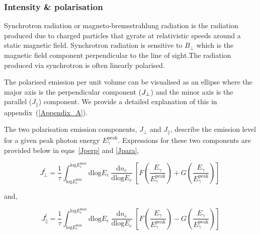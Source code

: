 \documentclass[usenatbib]{mnras}
\begin{document}
\subsubsection{Intensity \& polarisation}
Synchrotron radiation or magneto-bremsstrahlung radiation is the radiation produced due to charged particles that gyrate at relativistic speeds around a static magnetic field. Synchrotron radiation is sensitive to $B_{\perp}$ which is the magnetic field component perpendicular to the line of sight.The radiation produced via synchrotron is often linearly polarised. 

The polarised emission per unit volume can be visualised as an ellipse where the major axis is the perpendicular component ($J_{\rm \perp}$) and the minor axis is the parallel ($J_{\parallel}$) component. We provide a detailed explanation of this in appendix~(\ref{Appendix_A}). 

The two polarisation emission components, $J_{\perp}$ and $J_{\parallel}$, describe the emission level for a  given peak photon energy $E_{\gamma}^{\mathrm{peak}}$. Expressions for these two components are provided below in eqns~\ref{Jperp} and \ref{Jpara},

\begin{equation}
 {J_{\perp}^l} = \frac{1}{\tau}  \int_{\mathrm{log}E_e^{\mathrm{min}}}^{\mathrm{log}E_e^{\mathrm{max}}}\mathrm{dlog}E_{e} \  \frac{\mathrm{d}n_e}{\mathrm{dlog}E_{e}} \  \left[F\left(\frac{E_{\gamma}}{E_{\gamma}^{\mathrm{peak}}}\right) + G\left(\frac{E_{\gamma}}{E_{\gamma}^{\mathrm{peak}}}\right)\right] \
 \label{Jperp}
\end{equation}

and,

\begin{equation}
{J_{\parallel}^l} = \frac{1}{\tau} \int_{\mathrm{log}E_e^{\mathrm{min}}}^{\mathrm{log}E_e^{\mathrm{max}}}\mathrm{dlog}E_{e} \ \frac{\mathrm{d}n_e}{\mathrm{dlog}E_{e}} \  \left[F\left(\frac{E_{\gamma}}{E_{\gamma}^{\mathrm{peak}}}\right) - G\left(\frac{E_{\gamma}}{E_{\gamma}^{\mathrm{peak}}}\right)\right] 
\label{Jpara}
\end{equation}
\end{document}
